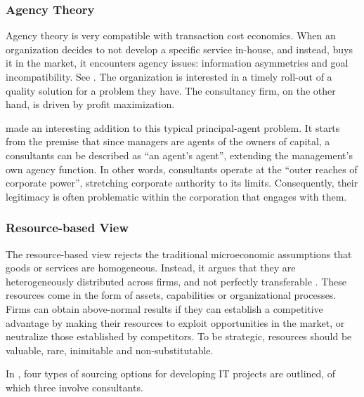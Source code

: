 \documentclass[12pt]{article}
\begin{document}
\hypertarget{agency-theory}{%
\subsubsection{Agency Theory}\label{agency-theory}}

Agency theory is very compatible with transaction cost economics. When
an organization decides to not develop a specific service in-house, and
instead, buys it in the market, it encounters agency issues: information
asymmetries and goal incompatibility. See \citet{shapiro2005}. The
organization is interested in a timely roll-out of a quality solution
for a problem they have. The consultancy firm, on the other hand, is
driven by profit maximization.

\citet{fincham2002} made an interesting addition to this typical
principal-agent problem. It starts from the premise that since managers
are agents of the owners of capital, a consultants can be described as
``an agent's agent'', extending the management's own agency function. In
other words, consultants operate at the ``outer reaches of corporate
power'', stretching corporate authority to its limits. Consequently,
their legitimacy is often problematic within the corporation that
engages with them.

\hypertarget{resource-based-view}{%
\subsubsection{Resource-based View}\label{resource-based-view}}

The resource-based view rejects the traditional microeconomic
assumptions that goods or services are homogeneous. Instead, it argues
that they are heterogeneously distributed across firms, and not
perfectly transferable \citet[392]{watjatrakul2005}. These resources
come in the form of assets, capabilities or organizational processes.
Firms can obtain above-normal results if they can establish a
competitive advantage by making their resources to exploit opportunities
in the market, or neutralize those established by competitors. To be
strategic, resources should be valuable, rare, inimitable and
non-substitutable.

In \citet[177-180]{willcocks2003}, four types of sourcing options for
developing IT projects are outlined, of which three involve consultants.
\end{document}
